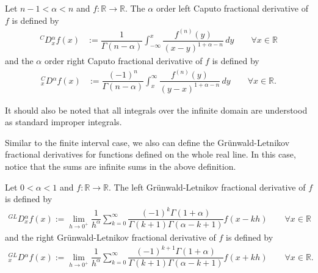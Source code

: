 \documentclass[leqno,final]{siamltex}
\numberwithin{equation}{section}
\renewcommand{\(}{\bigl(}
\renewcommand{\)}{\bigr)}
\newcommand{\R}{\mathbb{R}}
\begin{document}
 
            \begin{definition} \label{def2.6} 
                Let $n-1 <\alpha< n $ and $f :\R \rightarrow \R$. The $\alpha$ order left Caputo fractional derivative of $f$ is defined by 
                \begin{align*}
                    {^{C}}{{D}}{_{x}^{\alpha}} f(x) &:= \dfrac{1}{\Gamma(n- \alpha)} \int_{- \infty}^{x} \dfrac{f^{(n)}(y)}{(x- y)^{1+ \alpha -n} } \,dy \qquad \forall x \in \R
                \end{align*}
                and the $\alpha$ order right Caputo fractional derivative of $f$ is defined by
                \begin{align*}
                    {^{C}_{x}}{{D}}{^{\alpha}} f(x) &:= \dfrac{(-1)^n}{\Gamma(n - \alpha)}  \int_{x}^{\infty} \dfrac{f^{(n)}(y)}{ (y - x)^{1+\alpha -n} } \, dy \qquad \forall x \in \R.
                \end{align*}
            \end{definition}

            It should also be noted that all integrals over the infinite domain are understood as standard improper integrals. 

         
           	Similar to the finite interval case, we also can define the Gr\"unwald-Letnikov fractional derivatives for functions defined on the whole real line. In this case, notice that the sums are infinite sums in the above definition. 
 
            \begin{definition} 
                Let $0 < \alpha <1$ and $f : \R \rightarrow \R$. The left Gr\"unwald-Letnikov fractional derivative of $f$ is defined by 
                \begin{align*}
                   {^{GL}}{D}{^{\alpha}_{x}} f(x) := \lim_{h \rightarrow 0^+} \dfrac{1}{h^{\alpha}} \sum_{k = 0}^{\infty} \dfrac{(-1)^{k}\Gamma(1+\alpha)}{\Gamma(k+1) \Gamma(\alpha - k +1)} f(x- kh) \qquad \forall x \in \R
               \end{align*}
               and the right Gr\"unwald-Letnikov fractional derivative of $f$ is defined by
               \begin{align*}
                    {^{GL}_{x}}{D}{^{\alpha}} f(x) := \lim_{h \rightarrow 0^+} \dfrac{1}{h^{\alpha}} \sum_{k = 0}^{\infty} \dfrac{(-1)^{k+1}\Gamma(1+\alpha)}{\Gamma(k+1) \Gamma(\alpha - k +1)} f(x+ kh) \qquad \forall x \in \R.
                \end{align*}
            \end{definition}
        
\end{document}
